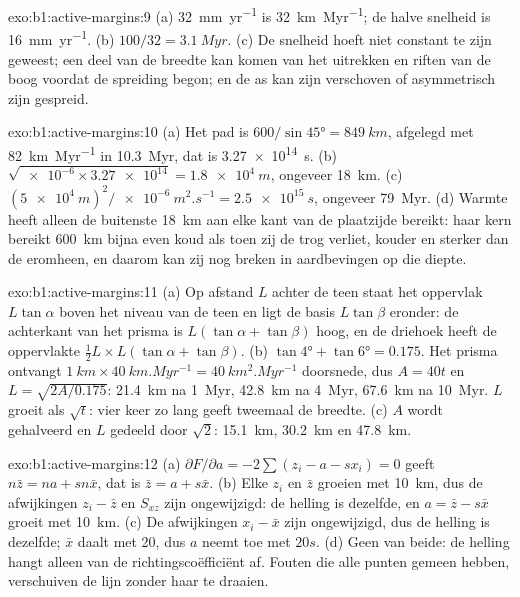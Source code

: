 \begin{solution}{exo:b1:active-margins:9}
(a) \qty{32}{mm.yr^{-1}} is \qty{32}{km.Myr^{-1}}; de halve snelheid is
\qty{16}{mm.yr^{-1}}. (b) $100/32 = \qty{3.1}{Myr}$. (c) De snelheid hoeft niet constant te zijn geweest; een deel van de breedte kan komen van het uitrekken en riften van de boog voordat de spreiding begon;
en de as kan zijn verschoven of asymmetrisch zijn gespreid.
\end{solution}

\begin{solution}{exo:b1:active-margins:10}
(a) Het pad is $600/\sin\ang{45} = \qty{849}{km}$, afgelegd met
\qty{82}{km.Myr^{-1}} in \qty{10.3}{Myr}, dat is \qty{3.27e14}{s}.
(b) $\sqrt{\num{e-6}\times\num{3.27e14}} = \qty{1.8e4}{m}$, ongeveer
\qty{18}{km}. (c) $(\qty{5e4}{m})^2/\qty{e-6}{m^2.s^{-1}} = \qty{2.5e15}{s}$,
ongeveer \qty{79}{Myr}. (d) Warmte heeft alleen de buitenste \qty{18}{km} aan elke kant van de plaatzijde bereikt: haar kern bereikt \qty{600}{km} bijna even koud als toen zij de trog verliet, kouder en sterker dan de  eromheen, en daarom kan zij nog breken in aardbevingen op die diepte.
\end{solution}

\begin{solution}{exo:b1:active-margins:11}
(a) Op afstand $L$ achter de teen staat het oppervlak $L\tan\alpha$ boven het niveau van de teen en ligt de basis $L\tan\beta$ eronder: de achterkant van het prisma is $L(\tan\alpha + \tan\beta)$ hoog, en de driehoek heeft de oppervlakte
$\frac12 L\times L(\tan\alpha + \tan\beta)$. (b) $\tan\ang{4} + \tan\ang{6} =
0.175$. Het prisma ontvangt $\qty{1}{km}\times\qty{40}{km.Myr^{-1}} =
\qty{40}{km^2.Myr^{-1}}$ doorsnede, dus $A = 40t$ en
$L = \sqrt{2A/0.175}$: \qty{21.4}{km} na \qty{1}{Myr}, \qty{42.8}{km}
na \qty{4}{Myr}, \qty{67.6}{km} na \qty{10}{Myr}. $L$ groeit als
$\sqrt t$: vier keer zo lang geeft tweemaal de breedte. (c) $A$ wordt gehalveerd en $L$ gedeeld door $\sqrt2$: \qty{15.1}{km}, \qty{30.2}{km} en \qty{47.8}{km}.
\end{solution}

\begin{solution}{exo:b1:active-margins:12}
(a) $\partial F/\partial a = -2\sum(z_i - a - s x_i) = 0$ geeft
$n\bar z = na + sn\bar x$, dat is $\bar z = a + s\bar x$. (b) Elke $z_i$ en
$\bar z$ groeien met \qty{10}{km}, dus de afwijkingen $z_i - \bar z$ en $S_{xz}$
zijn ongewijzigd: de helling is dezelfde, en $a = \bar z - s\bar x$ groeit met
\qty{10}{km}. (c) De afwijkingen $x_i - \bar x$ zijn ongewijzigd, dus de helling is
dezelfde; $\bar x$ daalt met 20, dus $a$ neemt toe met $20s$. (d) Geen van beide:
de helling hangt alleen van de richtingscoëfficiënt af. Fouten die alle punten gemeen hebben, verschuiven de lijn zonder haar te draaien.
\end{solution}

